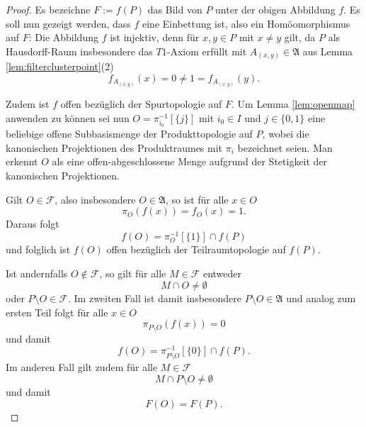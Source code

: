 \begin{proof}
  Es bezeichne $F := f(P)$ das Bild von $P$ unter der obigen Abbildung $f$.
  Es soll nun gezeigt werden, dass $f$ eine Einbettung ist, also ein Homöomorphismus auf $F$:
  Die Abbildung $f$ ist injektiv, denn für $x,y \in P$ mit $x \neq y$ gilt, da $P$ als Hausdorff-Raum insbesondere das $T1$-Axiom erfüllt mit $A_{(x,y)} \in \mathfrak{A}$ aus Lemma \ref{lem:filterclusterpoint}(2) 
  \begin{displaymath}
    f_{A_{(x,y)}}(x) = 0 \neq 1 = f_{A_{(x,y)}}(y).
  \end{displaymath}

  Zudem ist $f$ offen bezüglich der Spurtopologie auf $F$.
  Um Lemma \ref{lem:openmap} anwenden zu können sei nun $O = \pi_{i_0}^{-1}[\{j\}]$ mit $i_0 \in I$ und $j \in \{0,1\}$ eine beliebige offene Subbasismenge der Produkttopologie auf $P$,  wobei die kanonischen Projektionen des Produktraumes mit $\pi_i$ bezeichnet seien.
  Man erkennt $O$ als eine offen-abgeschlossene Menge aufgrund der Stetigkeit der kanonischen Projektionen.

  Gilt $O \in \mathcal{F}$, also insbesondere $O \in \mathfrak{A}$, so ist für alle $x \in O$
  \begin{displaymath}
    \pi_O(f(x)) = f_O(x) = 1.
  \end{displaymath}
  Daraus folgt 
  \begin{displaymath}
    f(O) = \pi_O^{-1}[\{1\}] \cap f(P)
  \end{displaymath}
  und folglich ist $f(O)$ offen bezüglich der Teilraumtopologie auf $f(P)$.

  Ist andernfalls $O \not\in \mathcal{F}$, so gilt für alle $M \in \mathcal{F}$ entweder
  \begin{displaymath}
    M \cap O \neq \emptyset
  \end{displaymath}
  oder $P \setminus O \in \mathcal{F}$.
  Im zweiten Fall ist damit insbesondere $P \setminus O \in \mathfrak{A}$ und analog zum ersten Teil folgt für alle $x \in O$
  \begin{displaymath}
    \pi_{P \setminus O}(f(x)) = 0
  \end{displaymath}
  und damit 
  \begin{displaymath}
    f(O) = \pi_{P \setminus O}^{-1}[\{0\}] \cap f(P).
  \end{displaymath}
  Im anderen Fall gilt zudem für alle $M \in \mathcal{F}$
  \begin{displaymath}
    M \cap P \setminus O \neq \emptyset
  \end{displaymath}
  und damit 
  \begin{displaymath}
    F(O) = F(P).
  \end{displaymath}


\end{proof}

